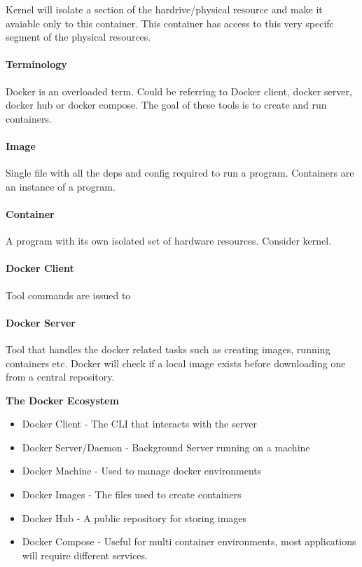 \documentclass[a4paper, 11pt]{book}
\begin{document}
    Kernel will isolate a section of the hardrive/physical resource and make it avaiable only to this container.
    This container has access to this very specifc segment of the physical resources.


    \paragraph{Terminology}
    Docker is an overloaded term.
    Could be referring to Docker client, docker server, docker hub or docker compose.
    The goal of these tools is to create and run containers.

    \paragraph{Image}
    Single file with all the deps and config required to run a program.
    Containers are an instance of a program.

    \paragraph{Container}
    A program with its own isolated set of hardware resources. Consider kernel.

    \paragraph{Docker Client}
    Tool commands are issued to

    \paragraph{Docker Server}
    Tool that handles the docker related tasks such as creating images, running containers etc.
    Docker will check if a local image exists before downloading one from a central repository.


    \textbf{The Docker Ecosystem}

    \begin{itemize}[label=-]
        \item Docker Client - The CLI that interacts with the server
        \item Docker Server/Daemon - Background Server running on a machine
        \item Docker Machine - Used to manage docker environments
        \item Docker Images - The files used to create containers
        \item Docker Hub - A public repository for storing images
        \item Docker Compose - Useful for multi container environments, most applications will require different services.
    \end{itemize}
\end{document}

